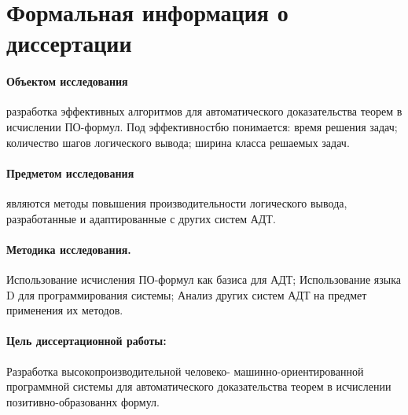 \section{Формальная информация о диссертации}


\paragraph{Объектом исследования}\hspace{-1em} разработка эффективных алгоритмов для автоматического доказательства теорем в исчислении ПО-формул. Под эффективностбю понимается: время решения задач; количество шагов логического вывода; ширина класса решаемых задач.

\paragraph{Предметом исследования}\hspace{-1em} являются методы повышения производительности логического вывода, разработанные и адаптированные с других систем АДТ.

\paragraph{Методика исследования.}\hspace{-1em} Использование исчисления ПО-формул как базиса для АДТ; Использование языка D для программирования системы; Анализ других систем АДТ на предмет применения их методов. 

\paragraph{Цель диссертационной работы:}\hspace{-1em} Разработка высокопроизводительной человеко- машинно-ориентированной программной системы для автоматического доказательства теорем в исчислении позитивно-образованнх формул.

